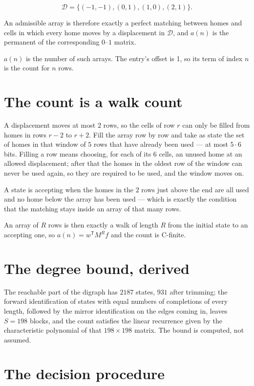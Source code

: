 \documentclass[11pt]{article}
\theoremstyle{definition}
\begin{document}
\[\mathcal{D} = \{(-1,-1), (0,1), (1,0), (2,1)\}.\]

An admissible array is therefore exactly a perfect matching between homes and cells in which every home moves by a displacement in $\mathcal{D}$, and $a(n)$ is the permanent of the corresponding $0$--$1$ matrix.

$a(n)$ is the number of such arrays. The entry's offset is 1, so its term of index $n$ is the count for $n$ rows.

\section{The count is a walk count}

A displacement moves at most $2$ rows, so the cells of row $r$ can only be filled from homes in rows $r-2$ to $r+2$. Fill the array row by row and take as state the set of homes in that window of $5$ rows that have already been used --- at most $5\cdot6$ bits. Filling a row means choosing, for each of its $6$ cells, an unused home at an allowed displacement; after that the homes in the oldest row of the window can never be used again, so they are required to be used, and the window moves on.

A state is accepting when the homes in the $2$ rows just above the end are all used and no home below the array has been used --- which is exactly the condition that the matching stays inside an array of that many rows.

An array of $R$ rows is then exactly a walk of length $R$ from the initial state to an accepting one, so $a(n) = w^{\mathsf T}M^{R}f$ and the count is C-finite.

\section{The degree bound, derived}

The reachable part of the digraph has $2187$ states, $931$ after trimming; the forward identification of states with equal numbers of completions of every length, followed by the mirror identification on the edges coming in, leaves $S = 198$ blocks, and the count satisfies the linear recurrence given by the characteristic polynomial of that $198\times198$ matrix. The bound is computed, not assumed.

\section{The decision procedure}
\end{document}
